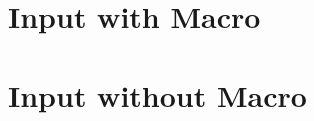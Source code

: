 \documentclass{article}
\newcommand{\datapath}{../data}
\begin{document}
\section{Input with Macro}


\section{Input without Macro}

\end{document}
